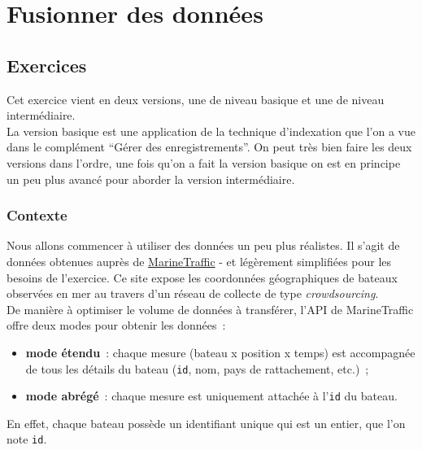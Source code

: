     \hypertarget{fusionner-des-donnuxe9es}{%
\section{Fusionner des données}\label{fusionner-des-donnuxe9es}}

    \hypertarget{exercices}{%
\subsection{Exercices}\label{exercices}}

    Cet exercice vient en deux versions, une de niveau basique et une de
niveau intermédiaire.\\

La version basique est une application de la technique d'indexation que
l'on a vue dans le complément ``Gérer des enregistrements''. On peut
très bien faire les deux versions dans l'ordre, une fois qu'on a fait la
version basique on est en principe un peu plus avancé pour aborder la
version intermédiaire.

    \hypertarget{contexte}{%
\subsubsection{Contexte}\label{contexte}}

    Nous allons commencer à utiliser des données un peu plus réalistes. Il
s'agit de données obtenues auprès de
\href{https://www.marinetraffic.com}{MarineTraffic} - et légèrement
simplifiées pour les besoins de l'exercice. Ce site expose les
coordonnées géographiques de bateaux observées en mer au travers d'un
réseau de collecte de type \emph{crowdsourcing}.\\

    De manière à optimiser le volume de données à transférer, l'API de
MarineTraffic offre deux modes pour obtenir les données~:

\begin{itemize}
	\item 
	\textbf{mode étendu}~: chaque mesure (bateau x position x temps) est accompagnée de
	tous les détails du bateau (\texttt{id}, nom, pays de rattachement, etc.)~;
	\item
	\textbf{mode abrégé}~: chaque mesure est uniquement attachée à
	l'\texttt{id} du bateau.	
\end{itemize}

En effet, chaque bateau possède un identifiant unique qui est un entier,
que l'on note \texttt{id}.

